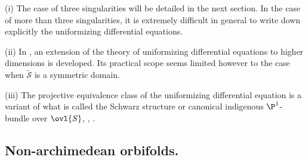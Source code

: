 \begin{rems}
  (i) The case of three singularities
 will be detailed in the next section. In the case of more than three
 singularities, it is extremely difficult in general to write down
 explicitly the uniformizing differential equations.

 (ii) In \cite{fde}, an extension of the theory of
 uniformizing differential equations to higher dimensions is
 developed. Its practical scope seems limited however to the case when
 $\tilde{\mathcal{S}}$ is a symmetric domain.

 (iii) The projective equivalence class of the uniformizing
 differential equation is a variant of what is called the Schwarz
 structure or canonical indigenous $\P^1$-bundle over $\ovl{S}$, \cf 
 \cite{gunning67:_special_rieman}, \cite{mochizuki96}.
\end{rems}

 
\subsection{Non-archimedean orbifolds.}\label{sub::4.4}

